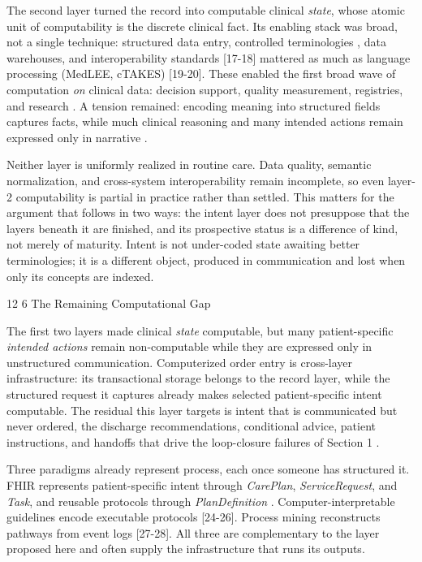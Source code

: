 \documentclass[3p,twocolumn]{elsarticle}
\makeatletter
\renewcommand\section{\@startsection{section}{1}{\z@}%
           {12\p@ \@plus 4\p@ \@minus 4\p@}%
           {6\p@ \@plus 4\p@ \@minus 3\p@}%
           {\normalsize\bfseries\boldmath}}
\makeatother
\begin{document}
The second layer turned the record into computable clinical \emph{state}, whose atomic unit of computability is the discrete clinical fact. Its enabling stack was broad, not a single technique: structured data entry, controlled terminologies \cite{ref16}, data warehouses, and interoperability standards {[}17-18{]} mattered as much as language processing (MedLEE, cTAKES) {[}19-20{]}. These enabled the first broad wave of computation \emph{on} clinical data: decision support, quality measurement, registries, and research \cite{ref21}. A tension remained: encoding meaning into structured fields captures facts, while much clinical reasoning and many intended actions remain expressed only in narrative \cite{ref22}.

Neither layer is uniformly realized in routine care. Data quality, semantic normalization, and cross-system interoperability remain incomplete, so even layer-2 computability is partial in practice rather than settled. This matters for the argument that follows in two ways: the intent layer does not presuppose that the layers beneath it are finished, and its prospective status is a difference of kind, not merely of maturity. Intent is not under-coded state awaiting better terminologies; it is a different object, produced in communication and lost when only its concepts are indexed.

\section{The Remaining Computational Gap}\label{the-remaining-computational-gap}

The first two layers made clinical \emph{state} computable, but many patient-specific \emph{intended actions} remain non-computable while they are expressed only in unstructured communication. Computerized order entry is cross-layer infrastructure: its transactional storage belongs to the record layer, while the structured request it captures already makes selected patient-specific intent computable. The residual this layer targets is intent that is communicated but never ordered, the discharge recommendations, conditional advice, patient instructions, and handoffs that drive the loop-closure failures of Section 1 \cite{ref1, ref6}.

Three paradigms already represent process, each once someone has structured it. FHIR represents patient-specific intent through \emph{CarePlan}, \emph{ServiceRequest}, and \emph{Task}, and reusable protocols through \emph{PlanDefinition} \cite{ref23}. Computer-interpretable guidelines encode executable protocols {[}24-26{]}. Process mining reconstructs pathways from event logs {[}27-28{]}. All three are complementary to the layer proposed here and often supply the infrastructure that runs its outputs.
\end{document}
